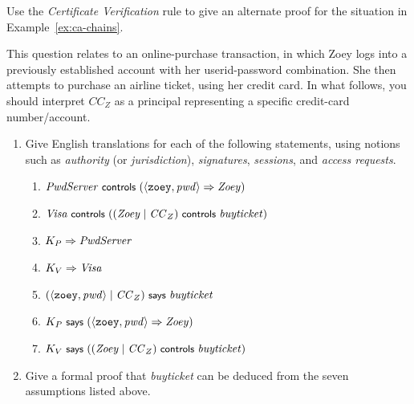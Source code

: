 \begin{exercise}[\appn]
  Use the \emph{Certificate Verification} rule to give an alternate
  proof for the situation in Example~\ref{ex:ca-chains}.
\end{exercise}

\begin{exercise}[\appn]
  This question relates to an online-purchase transaction, in which
  Zoey logs into a previously established account with her
  userid-password combination.  She then attempts to purchase an airline
  ticket, using her credit card.  In what follows, you should interpret
  $\mathit{CC}_Z$ as a principal representing a specific credit-card
  number/account.
  \begin{enumerate}
  \item Give English translations for each of the following statements,
    using notions such as \emph{authority} (or \emph{jurisdiction}),
    \emph{signatures}, \emph{sessions}, and \emph{access requests}.

    \begin{enumerate}
    \item $\mathit{PwdServer} \text{\small\textsf{ controls }}
      (\langle \texttt{zoey},\mathit{pwd}\rangle \Rightarrow \mathit{Zoey})$
    \item $\mathit{Visa} \text{\small\textsf{ controls }} ((\mathit{Zoey}\;|\;
      \mathit{CC}_Z) \text{\small\textsf{ controls }} \mathit{buyticket})$
    \item $K_{P} \Rightarrow \mathit{PwdServer}$
    \item $K_{V} \Rightarrow \mathit{Visa}$
    \item $(\langle \texttt{zoey},\mathit{pwd}\rangle\;|\; \mathit{CC}_Z)
      \text{\small\textsf{ says }} \mathit{buyticket}$
    \item $K_{P} \text{\small\textsf{ says }} (\langle \texttt{zoey},\mathit{pwd}\rangle \Rightarrow
      \mathit{Zoey})$
    \item $K_{V} \text{\small\textsf{ says }} ((\mathit{Zoey}\;|\; \mathit{CC}_Z) \text{\small\textsf{ controls }}
      \mathit{buyticket})$
    \end{enumerate}

  \item Give a formal proof that \textit{buyticket} can be deduced from
    the seven assumptions listed above.
  \end{enumerate}

\end{exercise}

